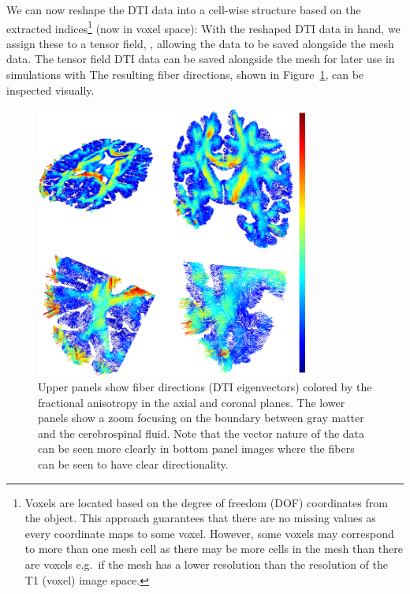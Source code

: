 We can now reshape the DTI data into a cell-wise structure based on
the extracted indices\footnote{Voxels are located based on the degree
  of freedom (DOF) coordinates from the  object. This
  approach guarantees that there are no missing values as every coordinate
  maps to some voxel. However, some voxels may correspond to more
  than one mesh cell as there may be more cells in the mesh than there
  are voxels e.g.~if the mesh has a lower resolution than the 
  resolution of the T1 (voxel) image space.} (now in voxel space):
\noindent With the reshaped DTI data in hand, we assign these to a {\fenics} tensor 
field, , allowing the data to be saved alongside the mesh data.
The {\fenics} tensor field DTI data can be saved alongside the mesh for later use 
in {\fenics} simulations with 
The resulting fiber directions, shown in Figure~\ref{fig:chp5:freesurfer-parc}, 
can be inspected visually.
\begin{figure}	
  \begin{center}
  \includegraphics[width=0.8\textwidth]{./graphics/chp5/fiber-fa-2cb.png}
  \end{center}
\caption{Upper panels show fiber directions (DTI eigenvectors) colored
  by the fractional anisotropy in the axial and coronal planes. The lower 
  panels show a zoom focusing on the boundary between gray matter and the 
  cerebrospinal fluid. Note that the vector nature of the data can be seen 
  more clearly in bottom panel images where the fibers can be seen to have 
  clear directionality.}
\label{fig:chp5:freesurfer-parc} 
\end{figure}

